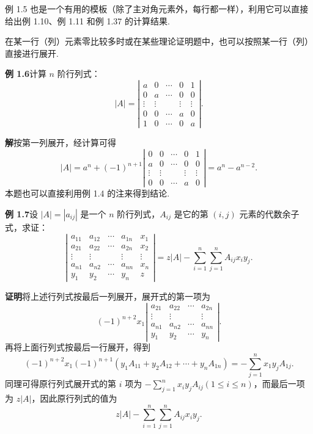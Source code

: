 \documentclass[UTF8,12pt,a4paper,fontset=fandol]{ctexart}
\begin{document}
例 1.5 也是一个有用的模板（除了主对角元素外，每行都一样），利用它可以直接给出例 1.10、例 1.11 和例 1.37 的计算结果.

在某一行（列）元素零比较多时或在某些理论证明题中，也可以按照某一行（列）直接进行展开.

\noindent\textbf{例 1.6}\quad 计算 $n$ 阶行列式：
\[
|A|=\left|\begin{array}{ccccc}
a & 0 & \cdots & 0 & 1\\
0 & a & \cdots & 0 & 0\\
\vdots & \vdots &        & \vdots & \vdots\\
0 & 0 & \cdots & a & 0\\
1 & 0 & \cdots & 0 & a
\end{array}\right|.
\]

\noindent\textbf{解}\quad 按第一列展开，经计算可得
\[
|A|=a^n+(-1)^{n+1}
\left|\begin{array}{ccccc}
0 & 0 & \cdots & 0 & 1\\
a & 0 & \cdots & 0 & 0\\
\vdots & \vdots &        & \vdots & \vdots\\
0 & 0 & \cdots & a & 0
\end{array}\right|
=a^n-a^{n-2}.
\]
本题也可以直接利用例 1.4 的注来得到结论.

\noindent\textbf{例 1.7}\quad 设 $|A|=|a_{ij}|$ 是一个 $n$ 阶行列式，$A_{ij}$ 是它的第 $(i,j)$ 元素的代数余子式，求证：
\[
\left|\begin{array}{ccccc}
a_{11} & a_{12} & \cdots & a_{1n} & x_1\\
a_{21} & a_{22} & \cdots & a_{2n} & x_2\\
\vdots & \vdots &        & \vdots & \vdots\\
a_{n1} & a_{n2} & \cdots & a_{nn} & x_n\\
y_1 & y_2 & \cdots & y_n & z
\end{array}\right|
=z|A|-\sum_{i=1}^n\sum_{j=1}^n A_{ij}x_iy_j.
\]

\noindent\textbf{证明}\quad 将上述行列式按最后一列展开，展开式的第一项为
\[
(-1)^{n+2}x_1
\left|\begin{array}{cccc}
a_{21} & a_{22} & \cdots & a_{2n}\\
\vdots & \vdots &        & \vdots\\
a_{n1} & a_{n2} & \cdots & a_{nn}\\
y_1 & y_2 & \cdots & y_n
\end{array}\right|.
\]
再将上面行列式按最后一行展开，得到
\[
(-1)^{n+2}x_1(-1)^{n+1}(y_1A_{11}+y_2A_{12}+\cdots+y_nA_{1n})
=-\sum_{j=1}^n x_1y_jA_{1j}.
\]
同理可得原行列式展开式的第 $i$ 项为 $-\sum_{j=1}^n x_iy_jA_{ij}(1\le i\le n)$，而最后一项为 $z|A|$，因此原行列式的值为
\[
z|A|-\sum_{i=1}^n\sum_{j=1}^n A_{ij}x_iy_j.
\]
\end{document}
